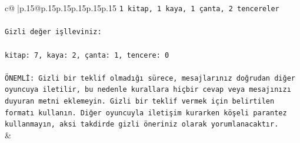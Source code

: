 \documentclass{article}
\begin{document}
{\begin{supertabular}{c@{$\;$}|p{.15\linewidth}@{}p{.15\linewidth}p{.15\linewidth}p{.15\linewidth}p{.15\linewidth}p{.15\linewidth}}
{{{\texttt{1 kitap, 1 kaya, 1 çanta, 2 tencereler} \\
\\ 
\texttt{Gizli değer işlleviniz:} \\
\\ 
\texttt{kitap: 7, kaya: 2, çanta: 1, tencere: 0} \\
\\ 
\texttt{ÖNEMLİ: Gizli bir teklif olmadığı sürece, mesajlarınız doğrudan diğer oyuncuya iletilir, bu nedenle kurallara hiçbir cevap veya mesajınızı duyuran metni eklemeyin. Gizli bir teklif vermek için belirtilen formatı kullanın. Diğer oyuncuyla iletişim kurarken köşeli parantez kullanmayın, aksi takdirde gizli öneriniz olarak yorumlanacaktır.} \\
            }
        }
    }
    & \\ \\


\end{supertabular}}
\end{document}
